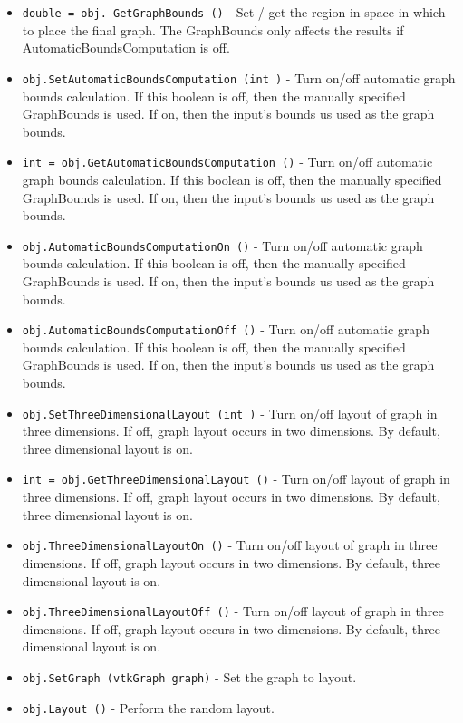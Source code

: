 \begin{itemize}
\item  \verb|double = obj. GetGraphBounds ()| -  Set / get the region in space in which to place the final graph.
 The GraphBounds only affects the results if AutomaticBoundsComputation
 is off.

\item  \verb|obj.SetAutomaticBoundsComputation (int )| -  Turn on/off automatic graph bounds calculation. If this
 boolean is off, then the manually specified GraphBounds is used.
 If on, then the input's bounds us used as the graph bounds.

\item  \verb|int = obj.GetAutomaticBoundsComputation ()| -  Turn on/off automatic graph bounds calculation. If this
 boolean is off, then the manually specified GraphBounds is used.
 If on, then the input's bounds us used as the graph bounds.

\item  \verb|obj.AutomaticBoundsComputationOn ()| -  Turn on/off automatic graph bounds calculation. If this
 boolean is off, then the manually specified GraphBounds is used.
 If on, then the input's bounds us used as the graph bounds.

\item  \verb|obj.AutomaticBoundsComputationOff ()| -  Turn on/off automatic graph bounds calculation. If this
 boolean is off, then the manually specified GraphBounds is used.
 If on, then the input's bounds us used as the graph bounds.

\item  \verb|obj.SetThreeDimensionalLayout (int )| -  Turn on/off layout of graph in three dimensions. If off, graph
 layout occurs in two dimensions. By default, three dimensional
 layout is on.

\item  \verb|int = obj.GetThreeDimensionalLayout ()| -  Turn on/off layout of graph in three dimensions. If off, graph
 layout occurs in two dimensions. By default, three dimensional
 layout is on.

\item  \verb|obj.ThreeDimensionalLayoutOn ()| -  Turn on/off layout of graph in three dimensions. If off, graph
 layout occurs in two dimensions. By default, three dimensional
 layout is on.

\item  \verb|obj.ThreeDimensionalLayoutOff ()| -  Turn on/off layout of graph in three dimensions. If off, graph
 layout occurs in two dimensions. By default, three dimensional
 layout is on.

\item  \verb|obj.SetGraph (vtkGraph graph)| -  Set the graph to layout.

\item  \verb|obj.Layout ()| -  Perform the random layout.

\end{itemize}

